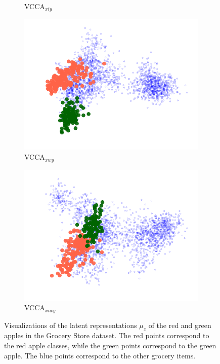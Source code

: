 \begin{figure}[t]
\begin{subfigure}[b]{0.3\textwidth}
         \caption{VCCA$_{x i y}$}
         \label{fig:pca_vcca_xiy_apples}
     \end{subfigure} 
     \begin{subfigure}[b]{0.3\textwidth}
         \centering
         \includegraphics[width=\textwidth]{PaperB/figures_and_tables/latent_space_visualizations/apples_new/pca_latent_apples_vcca_xwy_seed2.png}
         \caption{VCCA$_{x w y}$}
         \label{fig:pca_vcca_xwy_apples}
     \end{subfigure} 
     \begin{subfigure}[b]{0.3\textwidth}
         \centering
         \includegraphics[width=\textwidth]{PaperB/figures_and_tables/latent_space_visualizations/apples_new/pca_latent_apples_vcca_xiwy_seed2.png}
         \caption{VCCA$_{x i w y}$}
         \label{fig:pca_vcca_xiwy_apples}
     \end{subfigure} 
    \caption{Visualizations of the latent representations $\mu_{z}$ of the red and green apples in the Grocery Store dataset. The red points correspond to the red apple classes, while the green points correspond to the green apple. The blue points correspond to the other grocery items. 
    }
    \label{fig:2d_visualizations_pca_apples}
\end{figure}
